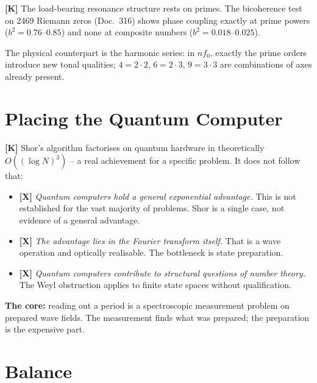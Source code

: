 \textbf{[K]} The load-bearing resonance structure rests on primes. The
bicoherence test on 2469 Riemann zeros (Doc.~316) shows phase coupling exactly
at prime powers ($b^2 = 0.76$--$0.85$) and none at composite numbers
($b^2 = 0.018$--$0.025$).

The physical counterpart is the harmonic series: in $n f_0$, exactly the prime
orders introduce new tonal qualities; $4 = 2\cdot2$, $6 = 2\cdot3$,
$9 = 3\cdot3$ are combinations of axes already present.

\section{Placing the Quantum Computer}

\textbf{[K]} Shor's algorithm factorises on quantum hardware in theoretically
$O((\log N)^3)$ -- a real achievement for a specific problem. It does not
follow that:

\begin{itemize}
  \item \textbf{[X]} \emph{Quantum computers hold a general exponential
    advantage.} This is not established for the vast majority of problems.
    Shor is a single case, not evidence of a general advantage.
  \item \textbf{[X]} \emph{The advantage lies in the Fourier transform
    itself.} That is a wave operation and optically realisable. The bottleneck
    is state preparation.
  \item \textbf{[X]} \emph{Quantum computers contribute to structural
    questions of number theory.} The Weyl obstruction applies to finite state
    spaces without qualification.
\end{itemize}

\textbf{The core:} reading out a period is a spectroscopic measurement problem
on prepared wave fields. The measurement finds what was prepared; the
preparation is the expensive part.

\section{Balance}

